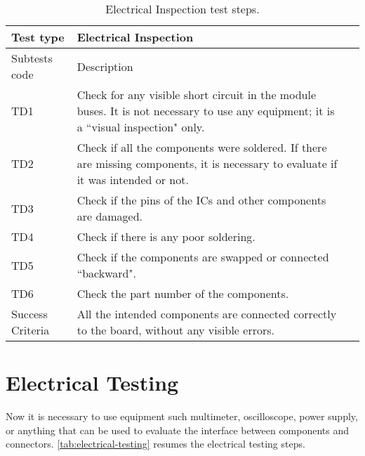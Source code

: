 \begin{table}[!htb]
\centering
\caption{Electrical Inspection test steps.}
\label{tab:electrical-inspection}
\begin{tabular}{m{3cm} m{12cm} m{3cm}}
\toprule
Test type & Electrical Inspection \\
\midrule
\midrule
Subtests code & Description \\ 
\midrule
TD1 & Check for any visible short circuit in the module buses. It is not necessary to use any equipment; it is a ``visual inspection" only. \\
\midrule
TD2 & Check if all the components were soldered. If there are missing components, it is necessary to evaluate if it was intended or not. \\
\midrule
TD3 & Check if the pins of the ICs and other components are damaged. \\
\midrule
TD4 & Check if there is any poor soldering. \\
\midrule
TD5 & Check if the components are swapped or connected ``backward". \\
\midrule
TD6 & Check the part number of the components. \\
\midrule
\midrule
Success Criteria & All the intended components are connected correctly to the board, without any visible errors. \\
\bottomrule
\end{tabular}
\end{table}


\section {Electrical Testing}

Now it is necessary to use equipment such multimeter, oscilloscope, power supply, or anything that can be used to evaluate the interface between components and connectors. \autoref{tab:electrical-testing} resumes the electrical testing steps.

